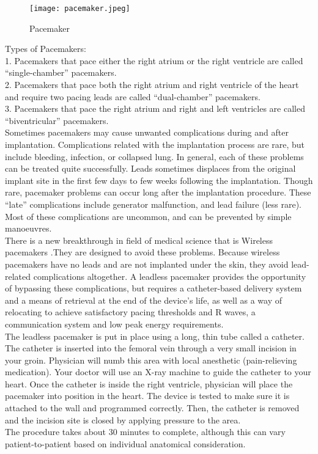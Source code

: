 \documentclass[12pt]{article}
\begin{document}
\begin{figure}[h]
\centering
\texttt{[image: pacemaker.jpeg]}
\caption{Pacemaker}
\end{figure}

Types of Pacemakers:\\
1. Pacemakers that pace either the right atrium or the right ventricle are called “single-chamber” pacemakers.\\
2. Pacemakers that pace both the right atrium and right ventricle of the heart and require two pacing leads are called “dual-chamber” pacemakers.\\
3. Pacemakers that pace the right atrium and right and left ventricles are called “biventricular” pacemakers.\\



Sometimes pacemakers may cause unwanted complications during and after implantation. Complications related with the implantation process are rare, but include bleeding, infection, or collapsed lung. In general, each of these problems can be treated quite successfully. Leads sometimes displaces from the original implant site in the first few days to few weeks following the implantation. Though rare, pacemaker problems can occur long after the implantation procedure. These “late” complications include generator malfunction, and lead failure (less rare). Most of these complications are uncommon, and can be prevented by simple manoeuvres.\\

There is a new breakthrough in field of medical science that is Wireless pacemakers .They are designed to avoid these problems. Because wireless pacemakers have no leads and are not implanted under the skin, they avoid lead-related complications altogether. A leadless pacemaker provides the opportunity of bypassing these complications, but requires a catheter-based delivery system and a means of retrieval at the end of the device’s life, as well as a way of relocating to achieve satisfactory pacing thresholds and R waves, a communication system and low peak energy requirements.\\

The leadless pacemaker is put in place using a long, thin tube called a catheter. The catheter is inserted into the femoral vein through a very small incision in your groin. Physician will numb this area with local anesthetic (pain-relieving medication). Your doctor will use an X-ray machine to guide the catheter to your heart. Once the catheter is inside the right ventricle, physician will place the pacemaker into position in the heart. The device is tested to make sure it is attached to the wall and programmed correctly. Then, the catheter is removed and the incision site is closed by applying pressure to the area.\\
The procedure takes about 30 minutes to complete, although this can vary patient-to-patient based on individual anatomical consideration.\\
\end{document}
